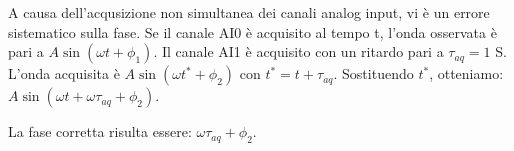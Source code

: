 \documentclass[../Relazione_circuiti]{subfiles}
\begin{document}
A causa dell'acqusizione non simultanea dei canali analog input, vi è un errore sistematico sulla fase.
Se il canale AI0 è acquisito al tempo t, l'onda osservata è pari a $A\sin(\omega t +\phi_1)$. Il canale AI1 è acquisito con un ritardo pari a $\tau_{aq} = 1$ \textmu S. L'onda acquisita è $A\sin(\omega t^* +\phi_2)$ con $t^*=t+\tau_{aq}$. Sostituendo $t^*$, otteniamo: $ A\sin(\omega t + \omega \tau_{aq} + \phi_2)$.

La fase corretta risulta essere: $\omega \tau_{aq} + \phi_2$.
\end{document}
